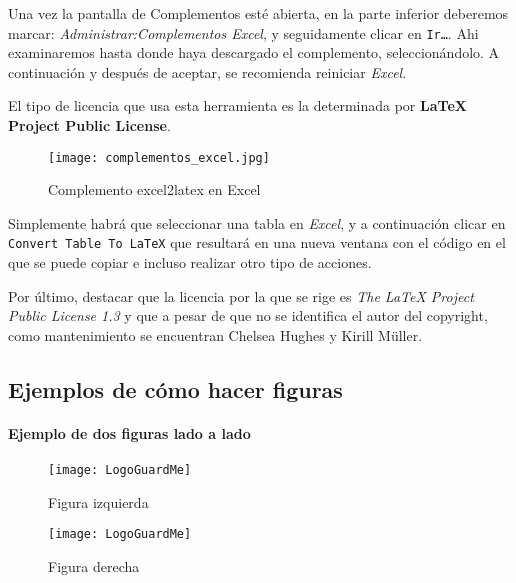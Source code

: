 Una vez la pantalla de Complementos esté abierta, en la parte inferior deberemos marcar: \textit{Administrar:Complementos Excel}, y seguidamente clicar en \texttt{Ir\dots}. Ahi examinaremos hasta donde haya descargado el complemento, seleccionándolo. A continuación y después de aceptar, se recomienda reiniciar \textit{Excel}.\newline

El tipo de licencia que usa esta herramienta es la determinada por \textbf{LaTeX Project Public Li­cense}.

\begin{figure}[H]
     \centering
     \texttt{[image: complementos\_excel.jpg]}
     \caption{Complemento excel2latex en Excel}
\end{figure}

Simplemente habrá que seleccionar una tabla en \textit{Excel}, y a continuación clicar en \texttt{Convert Table To LaTeX} que resultará en una nueva ventana con el código en el que se puede copiar e incluso realizar otro tipo de acciones.\newline

Por último, destacar que la licencia por la que se rige es \textit{The LaTeX Project Public Li­cense 1.3} y que a pesar de que no se identifica el autor del copyright, como mantenimiento se encuentran Chelsea Hughes y Kir­ill Müller.

\subsection*{Ejemplos de cómo hacer figuras}

\paragraph*{Ejemplo de dos figuras lado a lado}

\begin{figure}[H]
   \begin{minipage}{0.45\textwidth}
     \centering
     \texttt{[image: LogoGuardMe]}
     \caption{Figura izquierda}
     \label{fizq1}
   \end{minipage}
   \hfill
   \begin{minipage}{0.45\textwidth}
     \centering
     \texttt{[image: LogoGuardMe]}
     \caption{Figura derecha}
     \label{fdcha1}
   \end{minipage}
\end{figure}


